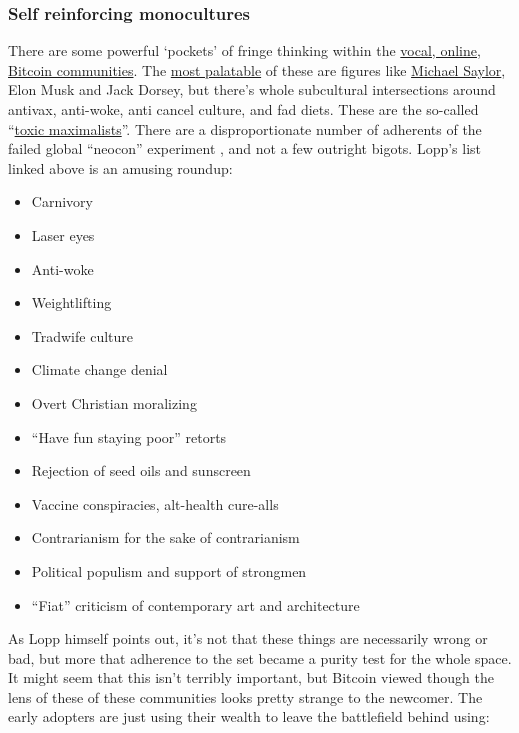 \begin{itemize}
\subsubsection{Self reinforcing monocultures}
There are some powerful `pockets' of fringe thinking within the \href{https://pourteaux.substack.com/p/bitcoin-culture-burn-it-to-the-ground?}{vocal, online, Bitcoin communities}. The \href{https://www.forbes.com/sites/peterizzo/2022/07/04/bitcoin-maximalism-is-dead-long-live-bitcoin-maximalism/?}{most palatable} of these are figures like \href{https://www.saylor.org/about/}{Michael Saylor}, Elon Musk and Jack Dorsey, but there's whole subcultural intersections around antivax, anti-woke, anti cancel culture, and fad diets. These are the so-called ``\href{https://blog.lopp.net/history-of-bitcoin-maximalism/}{toxic maximalists}''. There are a disproportionate number of adherents of the failed global ``neocon'' experiment \cite{va2010neoconservatism}, and not a few outright bigots. Lopp's list linked above is an amusing roundup:
\begin{itemize}
\item Carnivory
\item Laser eyes
\item Anti-woke
\item Weightlifting
\item Tradwife culture
\item Climate change denial
\item Overt Christian moralizing
\item ``Have fun staying poor'' retorts
\item Rejection of seed oils and sunscreen
\item Vaccine conspiracies, alt-health cure-alls
\item Contrarianism for the sake of contrarianism
\item Political populism and support of strongmen
\item ``Fiat'' criticism of contemporary art and architecture
\end{itemize}
As Lopp himself points out, it's not that these things are necessarily wrong or bad, but more that adherence to the set became a purity test for the whole space. It might seem that this isn't terribly important, but Bitcoin viewed though the lens of these of these communities looks pretty strange to the newcomer. The early adopters are just using their wealth to leave the battlefield behind using:

\end{itemize}
